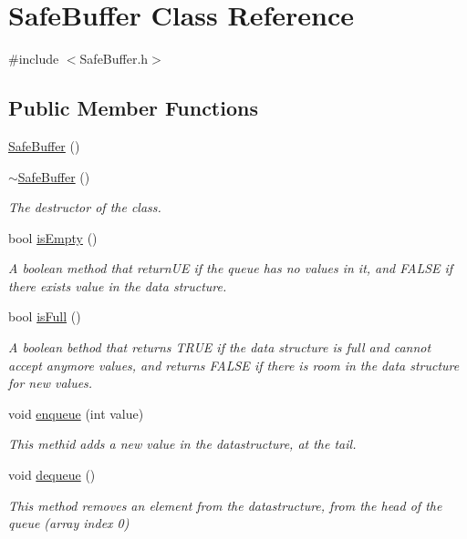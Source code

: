\hypertarget{classSafeBuffer}{}\section{Safe\+Buffer Class Reference}
\label{classSafeBuffer}


{\ttfamily \#include $<$Safe\+Buffer.\+h$>$}

\subsection*{Public Member Functions}
\begin{DoxyCompactItemize}
\item 
\hyperlink{classSafeBuffer_af835d8d08c4dcd3326f21ae2e9988699}{Safe\+Buffer} ()
\item 
\hyperlink{classSafeBuffer_a032ed6faedf42bfd0b79e757bf53c644}{$\sim$\+Safe\+Buffer} ()
\begin{DoxyCompactList}\small\item\em The destructor of the class. \end{DoxyCompactList}\item 
bool \hyperlink{classSafeBuffer_a0caf19dab729df52404c0f13aaf36ddc}{is\+Empty} ()
\begin{DoxyCompactList}\small\item\em A boolean method that return\+UE if the queue has no values in it, and F\+A\+L\+SE if there exists value in the data structure. \end{DoxyCompactList}\item 
bool \hyperlink{classSafeBuffer_ac383f154f080685aa2aef3c66771c585}{is\+Full} ()
\begin{DoxyCompactList}\small\item\em A boolean bethod that returns T\+R\+UE if the data structure is full and cannot accept anymore values, and returns F\+A\+L\+SE if there is room in the data structure for new values. \end{DoxyCompactList}\item 
void \hyperlink{classSafeBuffer_ad9cf3a0c9194cfcb75be17a406dff64e}{enqueue} (int value)
\begin{DoxyCompactList}\small\item\em This methid adds a new value in the datastructure, at the tail. \end{DoxyCompactList}\item 
void \hyperlink{classSafeBuffer_ae37fd5c3845e3a614e65887c2be72d07}{dequeue} ()
\begin{DoxyCompactList}\small\item\em This method removes an element from the datastructure, from the head of the queue (array index 0) \end{DoxyCompactList}\item 

\end{DoxyCompactItemize}
